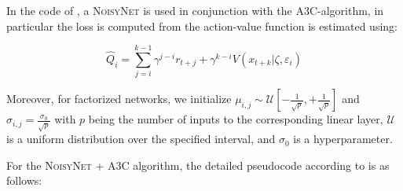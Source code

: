 \noindent In the code of \cite{rle-paper}, a \textsc{NoisyNet} is used in conjunction with the A3C-algorithm, in particular the loss is computed from the action-value function is estimated using:

\begin{equation}
  \hat{Q}_{i} = \sum_{j=i}^{k-1} \gamma^{j-i} r_{t+j} + \gamma^{k-i} V(x_{t+k} | \zeta, \varepsilon_{i})
\end{equation}

Moreover, for factorized networks, we initialize $\mu_{i,j} \sim \mathcal{U}\left[-\frac{1}{\sqrt{p}}, +\frac{1}{\sqrt{p}}\right]$ and $\sigma_{i,j} = \frac{\sigma_{0}}{\sqrt{p}}$ with $p$ being the number of inputs to the corresponding linear layer, $\mathcal{U}$ is a uniform distribution over the specified interval, and $\sigma_{0}$ is a hyperparameter.

\noindent For the \textsc{NoisyNet} + A3C algorithm, the detailed pseudocode according to \cite{noisynet-paper} is as follows:

